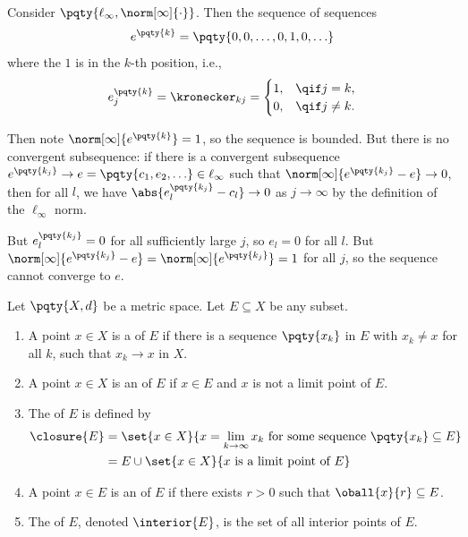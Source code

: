 \begin{example}
    \label{ex:bounded-sequence-in-l-infty-with-no-convergent-subsequence}%
    Consider \(\pqty{\ell_{\infty}, \norm[\infty]{\cdot}}\). Then the sequence of sequences
    \[
        e^{\pqty{k}} = \pqty{0, 0, \ldots, 0, 1, 0, \ldots}
    \]
    where the \(1\) is in the \(k\)-th position, i.e., 
    \[
        e_j^{\pqty{k}} = \kronecker_{kj} = \begin{cases}
            1, & \qif j = k,\\
            0, & \qif j \neq k.
        \end{cases}
    \]

    Then note \(\norm[\infty]{e^{\pqty{k}}} = 1\), so the sequence is bounded. But there is no convergent subsequence: if there is a convergent subsequence \(e^{\pqty{k_j}} \to e = \pqty{c_1, e_2, \ldots} \in \ell_{\infty}\) such that \(\norm[\infty]{e^{\pqty{k_j}} - e} \to 0\), then for all \(l\), we have \(\abs{e_l^{\pqty{k_j}} - c_l} \to 0\) as \(j \to \infty\) by the definition of the \(\ell_{\infty}\) norm.

    But \(e_l^{\pqty{k_j}} = 0\) for all sufficiently large \(j\), so \(e_l = 0\) for all \(l\). But \(\norm[\infty]{e^{\pqty{k_j}} - e} = \norm[\infty]{e^{\pqty{k_j}}} = 1\) for all \(j\), so the sequence cannot converge to \(e\).
\end{example}

\begin{definition}
    Let \(\pqty{X, d}\) be a metric space. Let \(E \subseteq X\) be any subset.

    \begin{enumerate}[label=(\roman*)]
        \item A point \(x \in X\) is a  of \(E\) if there is a sequence \(\pqty{x_k}\) in \(E\) with \(x_k \neq x\) for all \(k\),  such that \(x_k \to x\) in \(X\).
        \item A point \(x \in X\) is an  of \(E\) if \(x \in E\) and \(x\) is not a limit point of \(E\).
        \item The  of \(E\) is defined by
        \begin{align*}
            \closure{E} &= \set{x \in X}{x = \lim_{k \to \infty} x_k \text{ for some sequence } \pqty{x_k} \subseteq E} \\
            &= E \cup \set{x \in X}{x \text{ is a limit point of } E}
        \end{align*}
        \item A point \(x \in E\) is an  of \(E\) if there exists \(r > 0\) such that \(\oball{x}{r} \subseteq E\).
        \item The  of \(E\), denoted \(\interior{E}\), is the set of all interior points of \(E\).
    \end{enumerate}
\end{definition}

